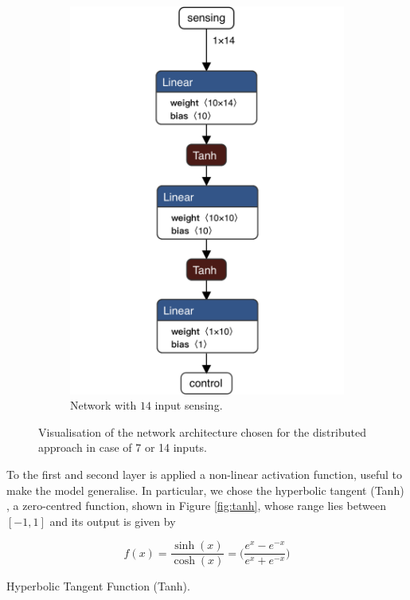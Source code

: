 \begin{figure}[htb]
\begin{subfigure}[h]{0.495\textwidth}
		\includegraphics[width=.8\textwidth]{contents/images/task1distributed_all@4x}
		\caption{Network with $14$ input sensing.}
		\label{fig:singlenet14distributed1}
	\end{subfigure}
	\caption[Network architectures for the distributed approach.]{Visualisation of 
	the network architecture chosen for the distributed approach in case of 7 or 14 
	inputs.}
	\label{fig:singlenetdistributed1}
\end{figure}
To the first and second layer is applied a non-linear activation function, 
useful to make the model generalise. 
In particular, we chose the hyperbolic tangent (Tanh) 
\cite[see][]{kalman1992}, a zero-centred function, shown in Figure 
\ref{fig:tanh}, whose range lies between $[-1, 1]$ and its output is given by

\begin{Equation}[H]
	\centering
	\begin{equation}
	f(x)= \frac{\sinh (x)}{\cosh (x)} = \bigg( \frac{e^x - e^{-x}}{e^x + 
		e^{-x}}\bigg)
	\end{equation}
	\caption{Hyperbolic Tangent Function (Tanh).}
	\label{eq:tanh}
\end{Equation}

